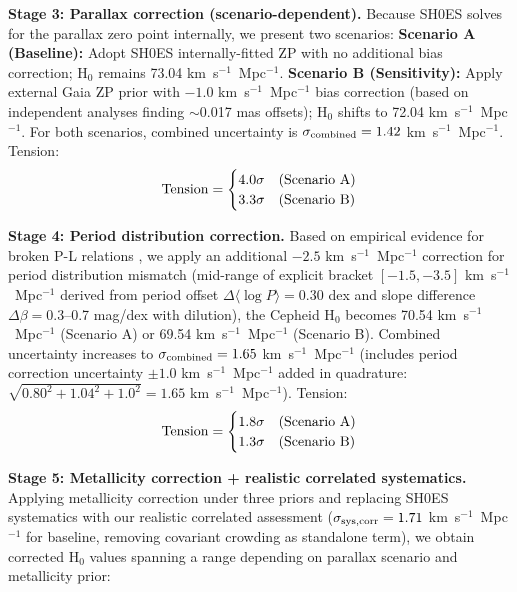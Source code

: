 \documentclass[preprint, linenumbers]{aastex701}
\begin{document}
\textbf{Stage 3: Parallax correction (scenario-dependent).} Because SH0ES solves for the parallax zero point internally, we present two scenarios: \textbf{Scenario A (Baseline):} Adopt SH0ES internally-fitted ZP with no additional bias correction; H$_0$ remains 73.04 km~s$^{-1}$~Mpc$^{-1}$. \textbf{Scenario B (Sensitivity):} Apply external Gaia ZP prior with $-1.0$ km~s$^{-1}$~Mpc$^{-1}$ bias correction (based on independent analyses finding $\sim$0.017 mas offsets); H$_0$ shifts to 72.04 km~s$^{-1}$~Mpc$^{-1}$. For both scenarios, combined uncertainty is $\sigma_{\rm combined} = 1.42$ km~s$^{-1}$~Mpc$^{-1}$. Tension:
\begin{equation}
{\rm Tension} = \begin{cases} 4.0\sigma & \text{(Scenario A)} \\ 3.3\sigma & \text{(Scenario B)} \end{cases}
\end{equation}

\textbf{Stage 4: Period distribution correction.} Based on empirical evidence for broken P-L relations \citep{Ngeow2006,Kodric2015}, we apply an additional $-2.5$ km~s$^{-1}$~Mpc$^{-1}$ correction for period distribution mismatch (mid-range of explicit bracket $[-1.5, -3.5]$ km~s$^{-1}$~Mpc$^{-1}$ derived from period offset $\Delta\langle \log P \rangle = 0.30$ dex and slope difference $\Delta\beta = 0.3$--0.7 mag/dex with dilution), the Cepheid H$_0$ becomes 70.54 km~s$^{-1}$~Mpc$^{-1}$ (Scenario A) or 69.54 km~s$^{-1}$~Mpc$^{-1}$ (Scenario B). Combined uncertainty increases to $\sigma_{\rm combined} = 1.65$ km~s$^{-1}$~Mpc$^{-1}$ (includes period correction uncertainty $\pm 1.0$ km~s$^{-1}$~Mpc$^{-1}$ added in quadrature: $\sqrt{0.80^2 + 1.04^2 + 1.0^2} = 1.65$ km~s$^{-1}$~Mpc$^{-1}$). Tension:
\begin{equation}
{\rm Tension} = \begin{cases} 1.8\sigma & \text{(Scenario A)} \\ 1.3\sigma & \text{(Scenario B)} \end{cases}
\end{equation}

\textbf{Stage 5: Metallicity correction + realistic correlated systematics.} Applying metallicity correction under three priors and replacing SH0ES systematics with our realistic correlated assessment ($\sigma_{\rm sys,corr} = 1.71$ km~s$^{-1}$~Mpc$^{-1}$ for baseline, removing covariant crowding as standalone term), we obtain corrected H$_0$ values spanning a range depending on parallax scenario and metallicity prior:
\end{document}
